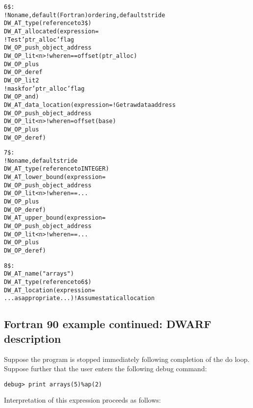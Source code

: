 \begin{alltt}
6\$: 
        ! No name, default (Fortran) ordering, default stride
        DW\-\_AT\-\_type(reference to 3\$)
        DW\-\_AT\-\_allocated(expression=
             ! Test 'ptr\_alloc' flag
            DW\-\_OP\-\_push\-\_object\-\_address
            DW\-\_OP\-\_lit<n> ! where n == offset(ptr\_alloc)
            DW\-\_OP\-\_plus
            DW\-\_OP\-\_deref
            DW\-\_OP\-\_lit2
             ! mask for 'ptr\_alloc' flag
            DW\-\_OP\-\_and)
        DW\-\_AT\-\_data\-\_location(expression= ! Get raw data address
            DW\-\_OP\-\_push\-\_object\-\_address
            DW\-\_OP\-\_lit<n> ! where n = offset(base)
            DW\-\_OP\-\_plus
            DW\-\_OP\-\_deref)

7\$: 
        ! No name, default stride
        DW\-\_AT\-\_type(reference to INTEGER)
        DW\-\_AT\-\_lower\-\_bound(expression=
            DW\-\_OP\-\_push\-\_object\-\_address
            DW\-\_OP\-\_lit<n> ! where n == ...
            DW\-\_OP\-\_plus
            DW\-\_OP\-\_deref)
        DW\-\_AT\-\_upper\-\_bound(expression=
            DW\-\_OP\-\_push\-\_object\-\_address
            DW\-\_OP\-\_lit<n> ! where n == ...
            DW\-\_OP\-\_plus
            DW\-\_OP\-\_deref)

8\$: 
        DW\-\_AT\-\_name("arrays")
        DW\-\_AT\-\_type(reference to 6\$)
        DW\-\_AT\-\_location(expression=
            ...as appropriate...) ! Assume static allocation
\end{alltt}

\subsection{Fortran 90 example continued: DWARF description}
\label{app:fortran90examplecontinueddwarfdescription}

Suppose the program is stopped immediately following completion
of the do loop. Suppose further that the user enters the
following debug command:

\begin{lstlisting}
debug> print arrays(5)%ap(2)
\end{lstlisting}

Interpretation of this expression proceeds as follows:

